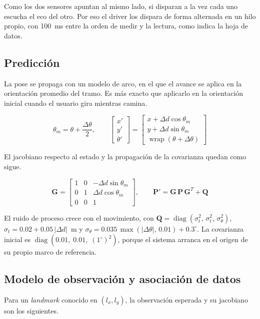 Como los dos sensores apuntan al mismo lado, si disparan a la vez cada uno escucha el eco
del otro. Por eso el driver los dispara de forma alternada en un hilo propio, con
100~ms entre la orden de medir y la lectura, como indica la hoja de datos.

\subsection{Predicción}

La pose se propaga con un modelo de arco, en el que el avance se aplica en la
orientación promedio del tramo. Es más exacto que aplicarlo en la orientación inicial
cuando el usuario gira mientras camina.

\[
\theta_m = \theta + \frac{\Delta\theta}{2},
\qquad
\begin{bmatrix} x' \\ y' \\ \theta' \end{bmatrix}
=
\begin{bmatrix}
x + \Delta d \cos\theta_m \\
y + \Delta d \sin\theta_m \\
\operatorname{wrap}(\theta + \Delta\theta)
\end{bmatrix}
\]

El jacobiano respecto al estado y la propagación de la covarianza quedan como sigue.

\[
\mathbf{G} =
\begin{bmatrix}
1 & 0 & -\Delta d \sin\theta_m \\
0 & 1 & \Delta d \cos\theta_m \\
0 & 0 & 1
\end{bmatrix},
\qquad
\mathbf{P}' = \mathbf{G}\,\mathbf{P}\,\mathbf{G}^T + \mathbf{Q}
\]

El ruido de proceso crece con el movimiento, con
$\mathbf{Q} = \operatorname{diag}(\sigma_t^2,\, \sigma_t^2,\, \sigma_\theta^2)$,
$\sigma_t = 0.02 + 0.05\,|\Delta d|$~m y
$\sigma_\theta = 0.035\,\max(|\Delta\theta|,\, 0.01) + 0.3^\circ$. La covarianza
inicial es $\operatorname{diag}(0.01,\; 0.01,\; (1^\circ)^2)$, porque el sistema arranca
en el origen de su propio marco de referencia.

\subsection{Modelo de observación y asociación de datos}

Para un \emph{landmark} conocido en $(l_x, l_y)$, la observación esperada y su
jacobiano son los siguientes.

